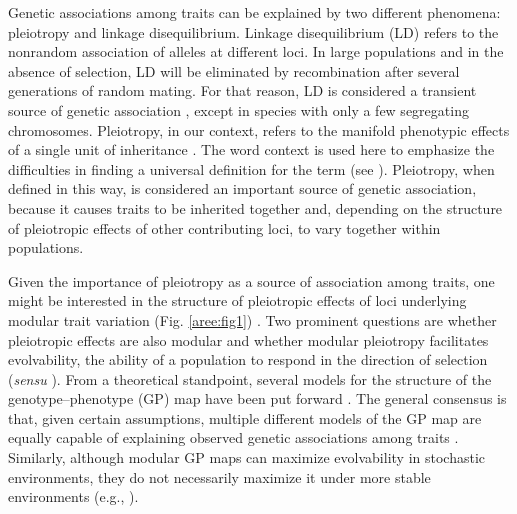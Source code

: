 \begin{refsection}
Genetic associations among traits can be explained by two different
phenomena: pleiotropy and linkage disequilibrium. Linkage disequilibrium
(LD) refers to the nonrandom association of alleles at different loci.
In large populations and in the absence of selection, LD will be
eliminated by recombination after several generations of random mating.
For that reason, LD is considered a transient source of genetic
association \parencite{Cheverud1996-jw}, except in
species with only a few segregating chromosomes. Pleiotropy, in our
context, refers to the manifold phenotypic effects of a single unit of
inheritance \parencite{Stearns2010-yc}. The word
context is used here to emphasize the difficulties in finding a
universal definition for the term (see \textcite{Paaby2013-cj}). Pleiotropy,
when defined in this way, is considered an important source of genetic
association, because it causes traits to be inherited together and,
depending on the structure of pleiotropic effects of other contributing
loci, to vary together within populations.

Given the importance of pleiotropy as a source of association among
traits, one might be interested in the structure of pleiotropic effects
of loci underlying modular trait variation
(Fig. \ref{aree:fig1})
\parencite{Wagner1996-ui}. Two
prominent questions are whether pleiotropic effects are also modular and
whether modular pleiotropy facilitates evolvability, the ability of a
population to respond in the direction of selection (\emph{sensu} \textcite{Hansen2003-fh}). 
From a theoretical standpoint, several models for the structure
of the genotype--phenotype (GP) map have been put forward
\parencite{Hansen2003-fh, Mitteroecker2009-jb, Pavlicev2011-xm}. The general
consensus is that, given certain assumptions, multiple different models
of the GP map are equally capable of explaining observed genetic
associations among traits \parencite{Mitteroecker2009-jb}. Similarly, although modular GP maps can maximize evolvability in stochastic environments, they do not necessarily maximize it under
more stable environments (e.g., \textcite{Hansen2003-fh}).


\end{refsection}
